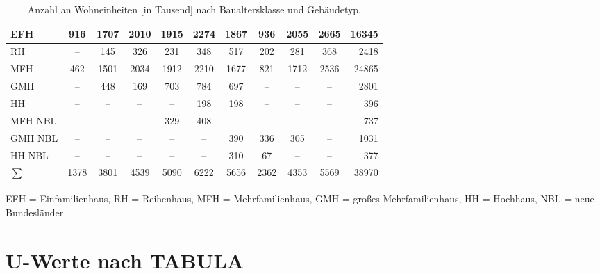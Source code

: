 \begin{table}[H]
\begin{tabular}{|l|c|c|c|c|c|c|c|c|c|r|}
EFH & 916 & 1707 & 2010 & 1915 & 2274 & 1867 & 936 & 2055 & 2665 & 16345 \\ \hline
\rowcolor[HTML]{EFEFEF} 
RH & -- & 145 & 326 & 231 & 348 & 517 & 202 & 281 & 368 & 2418 \\ \hline
MFH & 462 & 1501 & 2034 & 1912 & 2210 & 1677 & 821 & 1712 & 2536 & 24865 \\ \hline
\rowcolor[HTML]{EFEFEF} 
GMH & -- & 448 & 169 & 703 & 784 & 697 & -- & -- & -- & 2801 \\ \hline
HH & -- & -- & -- & -- & 198 & 198 & -- & -- & -- & 396 \\ \hline
\rowcolor[HTML]{EFEFEF} 
MFH NBL & -- & -- & -- & 329 & 408 & -- & -- & -- & -- & 737 \\ \hline
GMH NBL & -- & -- & -- & -- & -- & 390 & 336 & 305 & -- & 1031 \\ \hline
\rowcolor[HTML]{EFEFEF} 
HH NBL & -- & -- & -- & -- & -- & 310 & 67 & -- & -- & 377 \\ \hline
\(\sum\) & 1378 & 3801 & 4539 & 5090 & 6222 & 5656 & 2362 & 4353 & 5569 & 38970 \\ \hline
\end{tabular}
\caption{Anzahl an Wohneinheiten [in Tausend] nach Baualtersklasse und Gebäudetyp. \cite{Diefenbach.12.11.2007}}
\label{tab: TabelleA0}
\end{table}
EFH = Einfamilienhaus, RH = Reihenhaus, MFH = Mehrfamilienhaus, GMH = großes Mehrfamilienhaus, HH = Hochhaus, NBL = neue Bundesländer

\section{U-Werte nach TABULA}

